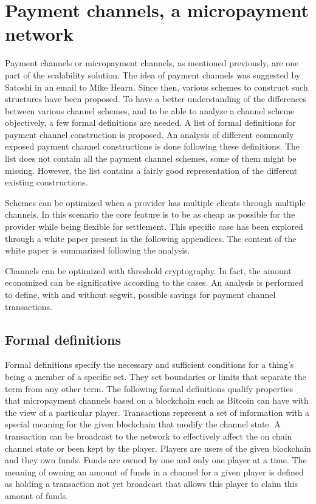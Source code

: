 \chapter{Payment channels, a micropayment network}
\label{chap:paymentChannels}

Payment channels or micropayment channels, as mentioned previously, are one part
of the scalability solution. The idea of payment channels was suggested by
Satoshi in an email to Mike Hearn. Since then, various schemes to construct
such structures have been proposed. To have a better understanding of the
differences between various channel schemes, and to be able to analyze a channel
scheme objectively, a few formal definitions are needed. A list of formal definitions for
payment channel construction is proposed. An analysis of different commonly
exposed payment channel constructions is done following these definitions. The
list does not contain all the payment channel schemes, some of them
might be missing. However, the list contains a fairly good representation of the
different existing constructions.

Schemes can be optimized when a provider has multiple clients through multiple
channels. In this scenario the core feature is to be as cheap as possible for
the provider while being flexible for settlement. This specific case has been
explored through a white paper present in the following appendices. The content
of the white paper is summarized following the analysis.

Channels can be optimized with threshold cryptography. In fact, the amount
economized can be significative according to the cases. An analysis is performed
to define, with and without \gls{segwit}, possible savings for
payment channel transactions.

\minitoc

\newpage

\section{Formal definitions}

Formal definitions specify the necessary and sufficient conditions for a thing’s
being a member of a specific set. They set boundaries or limits that separate
the term from any other term. The following formal definitions qualify
properties that micropayment channels based on a blockchain such as Bitcoin can
have with the view of a particular player. Transactions represent a set of
information with a special meaning for the given blockchain that modify the
channel state. A transaction can be broadcast to the network to effectively
affect the on chain channel state or been kept by the player. Players are users of the
given blockchain and they own funds. Funds are owned by one and only one
player at a time. The meaning of owning an amount of funds in a channel for a given player is defined as holding a transaction not yet broadcast that allows this player to claim this amount of funds.

